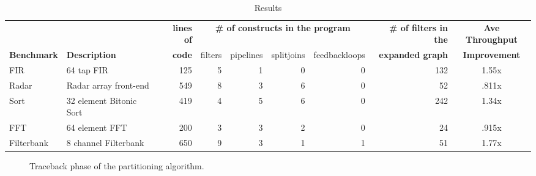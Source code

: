 \begin{table*}[th]
\begin{center}
\scriptsize
\begin{tabular}{|l|l||r||r|r|r|r||r||c||} \hline
 & & {\bf lines of} & \multicolumn{4}{|c||}{\bf \# of constructs in the program} & {\bf \# of filters in the} & {\bf Ave Throughput}\\ \cline{4-7}
{\bf Benchmark} & {\bf Description} & {\bf code} & filters & pipelines & splitjoins & feedbackloops & {\bf expanded graph} & {\bf Improvement}
\\
\hline \hline
FIR & 64 tap FIR & 
125 & 5 & 1 & 0 & 0 & 132 & 1.55x
\\ \hline
Radar & Radar array front-end\cite{pca} & 
549 & 8 & 3 & 6 & 0 & 52 & .811x
\\ \hline
Sort & 32 element Bitonic Sort & 
419 & 4 & 5 & 6 & 0 & 242 & 1.34x
\\  \hline
FFT & 64 element FFT & 
200 & 3 & 3 & 2 & 0 & 24 & .915x
\\  \hline
Filterbank & 8 channel Filterbank & 
650 & 9 & 3 & 1 & 1 & 51 & 1.77x
\\  \hline
\end{tabular}
\vspace{-6pt}
\caption{\protect\small Results}
\label{tab:benchmarks}
\end{center}
\end{table*}

  \begin{figure}[t]
    \caption{Traceback phase of the partitioning algorithm.
      \protect}
  \end{figure}
